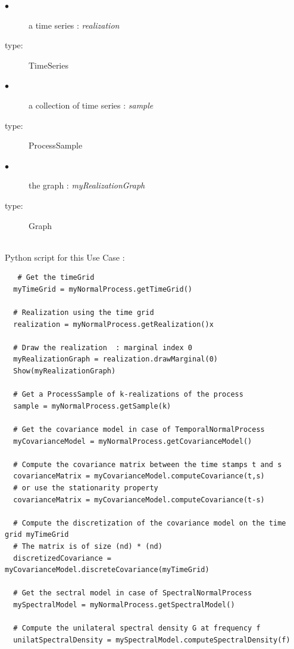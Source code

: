  
{

  \begin{description}
  \item[$\bullet$] a time series : {\itshape realization}
  \item[type:]  TimeSeries
  \end{description}

  \begin{description}
  \item[$\bullet$] a collection of time series : {\itshape sample}
  \item[type:]  ProcessSample
  \end{description}


  \begin{description}
  \item[$\bullet$] the graph : {\itshape myRealizationGraph}
  \item[type:]  Graph
  \end{description}
}

\textspace\\
Python script for this Use Case :

\begin{lstlisting}
   # Get the timeGrid
  myTimeGrid = myNormalProcess.getTimeGrid()

  # Realization using the time grid 
  realization = myNormalProcess.getRealization()x

  # Draw the realization  : marginal index 0
  myRealizationGraph = realization.drawMarginal(0)
  Show(myRealizationGraph)

  # Get a ProcessSample of k-realizations of the process
  sample = myNormalProcess.getSample(k)

  # Get the covariance model in case of TemporalNormalProcess
  myCovarianceModel = myNormalProcess.getCovarianceModel()
  
  # Compute the covariance matrix between the time stamps t and s
  covarianceMatrix = myCovarianceModel.computeCovariance(t,s)
  # or use the stationarity property
  covarianceMatrix = myCovarianceModel.computeCovariance(t-s)

  # Compute the discretization of the covariance model on the time grid myTimeGrid
  # The matrix is of size (nd) * (nd)
  discretizedCovariance = myCovarianceModel.discreteCovariance(myTimeGrid)

  # Get the sectral model in case of SpectralNormalProcess
  mySpectralModel = myNormalProcess.getSpectralModel()

  # Compute the unilateral spectral density G at frequency f
  unilatSpectralDensity = mySpectralModel.computeSpectralDensity(f)    
\end{lstlisting}

